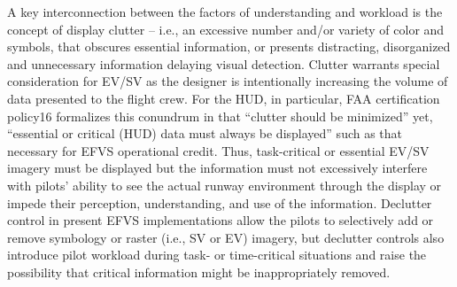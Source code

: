 \documentclass[utf8,bachelor,manualbib]{gradu3}
\begin{document}
A key interconnection between the factors of understanding and workload is the concept of display clutter –
i.e., an excessive number and/or variety of color and symbols, that obscures essential information, or presents
distracting, disorganized and unnecessary information delaying visual detection.
Clutter warrants special consideration for EV/SV as the designer is intentionally increasing the volume of data
presented to the flight crew. For the HUD, in particular, FAA certification policy16 formalizes this conundrum
in that “clutter should be minimized” yet, “essential or critical (HUD) data must always be displayed” such as
that necessary for EFVS operational credit. Thus, task-critical or essential EV/SV imagery must be displayed
but the information must not excessively interfere with pilots’ ability to see the actual runway environment
through the display or impede their perception, understanding, and use of the information. Declutter control
in present EFVS implementations allow the pilots to selectively add or remove symbology or raster (i.e., SV
or EV) imagery, but declutter controls also introduce pilot workload during task- or time-critical situations
and raise the possibility that critical information might be inappropriately removed. \citep{baileyym2007}
\end{document}
